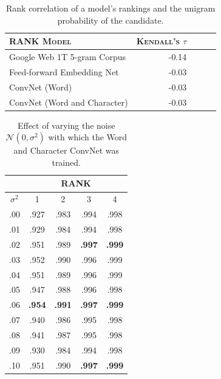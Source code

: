 \begin{frame}

\end{frame}

\begin{frame}
\centering
\begin{table}[]
\begin{tabular}{lrrrr}
\hline
\textsc{RANK Model} & \textsc{Kendall's} $\tau$ \\
\hline
Google Web 1T 5-gram Corpus & -0.14 \\
Feed-forward Embedding Net & -0.03 \\
ConvNet (Word) & -0.03 \\
ConvNet (Word and Character) & -0.03 \\
\hline
\end{tabular}
\caption{Rank correlation of a model's rankings and the unigram probability of the candidate.} 
\end{table}
\end{frame}

\begin{frame}
\centering
\begin{table}

\begin{tabular}{c|cccc}
           & \multicolumn{4}{c}{\textsc{RANK}} \\
           \hline
$\sigma^2$ & 1 & 2 & 3 & 4 \\
\hline
.00        & .927 & .983 & .994 & .998 \\
.01        & .929 & .984 & .994 & .998 \\
.02        & .951 & .989 & \textbf{.997} & \textbf{.999} \\
.03        & .952 & .990 & .996 & .999 \\
.04        & .951 & .989 & .996 & .999 \\
.05        & .947 & .988 & .996 & .998 \\
.06        & \textbf{.954} & \textbf{.991} & \textbf{.997} & \textbf{.999} \\
.07        & .940 & .986 & .995 & .998 \\
.08        & .941 & .987 & .995 & .998 \\
.09        & .930 & .984 & .994 & .998 \\
.10        & .951 & .990 & \textbf{.997} & \textbf{.999} \\
\end{tabular}
\caption{Effect of varying the noise $\mathcal{N}(0, \sigma^2)$ with which the Word and Character ConvNet was trained.}
\end{table}
\end{frame}